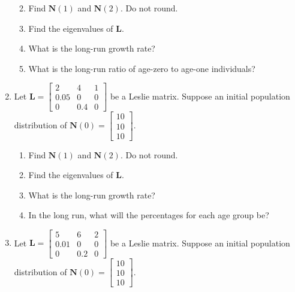 \documentclass[
]{book}
\providecommand{\tightlist}{%
  \setlength{\itemsep}{0pt}\setlength{\parskip}{0pt}}
\theoremstyle{definition}
\theoremstyle{definition}
\theoremstyle{definition}
\theoremstyle{definition}
\theoremstyle{remark}
\begin{document}
\begin{enumerate}
  \begin{enumerate}
  \def\labelenumii{\alph{enumii}.}
  \tightlist
  \item
    Find \(\mathbf{N}(1)\) and \(\mathbf{N}(2).\) Do not round.
  \item
    Find the eigenvalues of \(\mathbf{L}.\)
  \item
    What is the long-run growth rate?
  \item
    What is the long-run ratio of age-zero to age-one individuals?
  \end{enumerate}
\item
  Let \(\mathbf{L}=\begin{bmatrix} 2 & 4 & 1\\0.05 & 0 & 0\\0 & 0.4 & 0\end{bmatrix}\) be a Leslie matrix. Suppose an initial population distribution of \(\mathbf{N}(0)=\begin{bmatrix}10 \\10\\10\end{bmatrix}.\)

  \begin{enumerate}
  \def\labelenumii{\alph{enumii}.}
  \tightlist
  \item
    Find \(\mathbf{N}(1)\) and \(\mathbf{N}(2).\) Do not round.
  \item
    Find the eigenvalues of \(\mathbf{L}.\)
  \item
    What is the long-run growth rate?
  \item
    In the long run, what will the percentages for each age group be?
  \end{enumerate}
\item
  Let \(\mathbf{L}=\begin{bmatrix} 5 & 6 & 2\\0.01 & 0 & 0\\0 & 0.2 & 0\end{bmatrix}\) be a Leslie matrix. Suppose an initial population distribution of \(\mathbf{N}(0)=\begin{bmatrix}10 \\10\\10\end{bmatrix}.\)


\end{enumerate}
\end{document}
